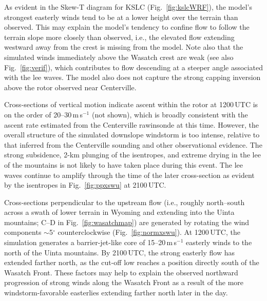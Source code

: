 \documentclass[pdftex,12pt]{article}
\def\mps{m\,s$^{-1}$}
\def\degarc{$^{\circ}$} %
\def\around{$\sim$}
\begin{document}
As evident in the Skew-T diagram for KSLC (Fig.~\ref{fig:kslcWRF}), the model's strongest easterly winds tend to be at a lower height over the terrain than observed. This may explain the model's tendency to confine flow to follow the terrain slope more closely than observed, i.e., the elevated flow extending westward away from the crest is missing from the model. Note also that the simulated winds immediately above the Wasatch crest are weak (see also Fig.~\ref{fig:verif}), which contributes to flow descending at a steeper angle associated with the lee waves. The model also does not capture the strong capping inversion above the rotor observed near Centerville.

Cross-sections of vertical motion indicate ascent within the rotor at 1200\,UTC is on the order of 20--30\,\mps{} (not shown), which is broadly consistent with the ascent rate estimated from the Centerville rawinsonde at this time. However, the overall structure of the simulated downslope windstorm is too intense, relative to that inferred from the Centerville sounding and other observational evidence. The strong subsidence, 2-km plunging of the isentropes, and extreme drying in the lee of the mountains is not likely to have taken place during this event. The lee waves continue to amplify through the time of the later cross-section as evident by the isentropes in Fig.~\ref{fig:ppxswu} at 2100\,UTC.

Cross-sections perpendicular to the upstream flow (i.e., roughly north--south across a swath of lower terrain in Wyoming and extending into the Uinta mountains; C--D in Fig.~\ref{fig:wasatchmap}) are generated by rotating the wind components \around 5\degarc{} counterclockwise (Fig.~\ref{fig:normxswu}). At 1200\,UTC, the simulation generates a barrier-jet-like core of 15--20\,\mps{} easterly winds to the north of the Uinta mountains. By 2100\,UTC, the strong easterly flow has extended farther north, as the cut-off low reaches a position directly south of the Wasatch Front. These factors may help to explain the observed northward progression of strong winds along the Wasatch Front as a result of the more windstorm-favorable easterlies extending farther north later in the day. 
\end{document}
